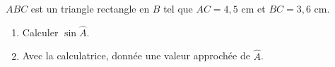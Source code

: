 
$ABC$ est un triangle rectangle en $B$ tel que $AC=4,5$ cm et $BC=3,6$ cm.
\begin{enumerate}
\item Calculer $\sin \widehat{A}$.
\item Avec la calculatrice, donnée une valeur approchée de $\widehat{A}$.
\end{enumerate}